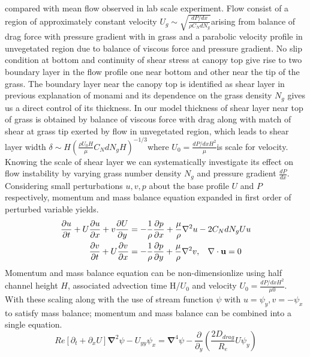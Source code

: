 \documentclass[aps,prl,twocolumn,showpacs,superscriptaddress,groupedaddress,10pt]{revtex4-1}  %
\newcommand{\bu}{\mathbf{u}}
\newcommand{\grad}{\mathbf{\nabla}}
\newcommand{\del}{\partial}
\begin{document}
compared with mean flow observed in lab scale experiment. Flow consist of a region of approximately constant velocity
\small$U_g \sim \sqrt{\frac{dP/dx}{\rho C_N dN_g}}$\normalsize arising from balance of drag force with pressure gradient with in grass and a parabolic velocity 
profile in unvegetated region due to balance of viscous force and pressure gradient. No slip condition at bottom and continuity of shear stress at canopy top 
give rise to two boundary layer in the flow profile one near bottom and other near the tip of the grass. The boundary layer near the canopy top is identified 
as shear layer in previous explanation of monami and its dependence on the grass density $N_g$ gives us a direct control of its thickness. 
In our model thickness of shear layer near top of grass is obtained by balance of viscous force 
with drag along with match of shear at grass tip exerted by flow in unvegetated region, which leads to shear layer 
width \small $\delta \sim  H\left(\frac{\rho U_0 H}{\mu} C_N d N_g H\right)^{-1/3}$\normalsize where \small$U_0 = \frac{dP/dxH^2}{\mu}$\normalsize is scale for velocity.
\newline
Knowing the scale of shear layer we can systematically investigate its effect on flow instability
by varying grass number density $N_g$ and pressure gradient $\frac{dP}{dx}$. Considering small perturbations $u, v, p$ about the base profile $U$ and $P$
respectively, momentum and mass balance equation expanded in first order of perturbed variable yields.
\small
\begin{equation}
\begin{split}
\frac{\del u}{\del t}+U\frac{\del u}{\del x}+v\frac{\del U}{\del y} &= -\frac{1}{\rho}\frac{\del p}{\del x}+\frac{\mu}{\rho}\nabla^2u-2C_{N}dN_{g}Uu\\
\frac{\del v}{\del  t}+ U\frac{\del v}{\del x} &= -\frac{1}{\rho}\frac{\del p}{\del y}+\frac{\mu}{\rho}\nabla^2v, \hspace{0.3cm} \nabla\cdot\bu=0\\
\end{split}
\end{equation}
\normalsize
Momentum and mass balance equation can be non-dimensionlize using half channel height $H$, associated advection time H/$U_0$ and velocity $U_0 = \frac{dP/dxH^2}{\mu0}$.
With these scaling along with the use of stream function $\psi$ with $u = \psi_{y}, v= -\psi_x$ to satisfy mass balance; momentum and mass balance can be combined 
into a single equation.
\begin{equation}
\scriptstyle{
Re\left[\del_t+\del_x U \right]\grad^2\psi - U_{yy}\psi_x = \grad^4\psi-\frac{\del}{\del_y}\left(\frac{2D_{drag}}{R_e}U\psi_y\right)
}
\end{equation}
\end{document}
